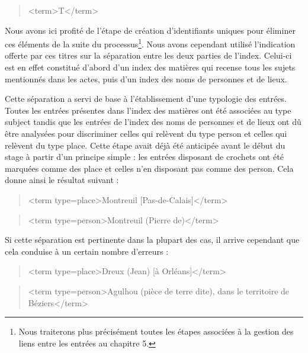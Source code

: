 \documentclass[a4paper,12pt,twoside]{book}
\begin{document}
	\begin{quotation}
		<term>T</term>
	\end{quotation}

	\noindent Nous avons ici profité de l'étape de création d'identifiants uniques pour éliminer ces éléments de la suite du processus\footnote{Nous traiterons plus précisément toutes les étapes associées à la gestion des liens entre les entrées au chapitre 5.}. Nous avons cependant utilisé l'indication offerte par ces titres sur la séparation entre les deux parties de l'index. Celui-ci est en effet constitué d'abord d'un index des matières qui recense tous les sujets mentionnés dans les actes, puis d'un index des noms de personnes et de lieux. 
	
	Cette séparation a servi de base à l'établissement d'une typologie des entrées. Toutes les entrées présentes dans l'index des matières ont été associées au type \og subject\fg{} tandis que les entrées de l'index des noms de personnes et de lieux ont dû être analysées pour discriminer celles qui relèvent du type \og person\fg{} et celles qui relèvent du type \og place\fg{}. Cette étape avait déjà été anticipée avant le début du stage à partir d'un principe simple : les entrées disposant de crochets ont été marquées comme des \og place\fg{} et celles n'en disposant pas comme des \og person\fg{}. Cela donne ainsi le résultat suivant : 
	
	\begin{quotation}
		<term type=\textquotesingle place\textquotesingle >Montreuil [Pas-de-Calais]</term>
	\end{quotation}

	\begin{quotation}
		<term type=\textquotesingle person\textquotesingle >Montreuil (Pierre de)</term>
	\end{quotation}

	\noindent Si cette séparation est pertinente dans la plupart des cas, il arrive cependant que cela conduise à un certain nombre d'erreurs :
	
	\begin{quotation}
		<term type=\textquotesingle place\textquotesingle >Dreux (Jean) [à Orléans]</term>
	\end{quotation}
	
	\begin{quotation}
		<term type=\textquotesingle person\textquotesingle >Agulhou (pièce de terre dite), dans le territoire de
			Béziers</term>
	\end{quotation}
	
\end{document}
